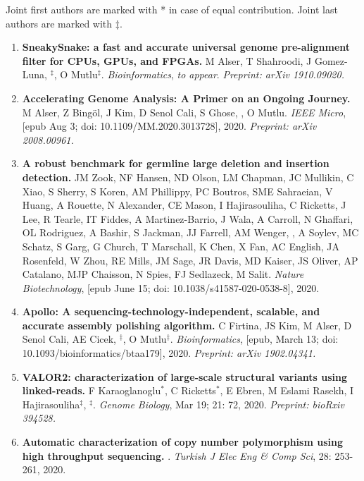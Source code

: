                                        \small{
                                         Joint first authors are marked with * in case of equal contribution. Joint last authors are marked with $\ddag$.
                                       }
\begin{enumerate}
    
\item
{\bf SneakySnake: a fast and accurate universal genome pre-alignment filter for CPUs, GPUs, and FPGAs.} M Alser, T Shahroodi, J Gomez-Luna, \calkan{}$^\ddag$, O Mutlu$^\ddag$. {\it Bioinformatics}, \textit{to appear}. \textit {Preprint: arXiv 1910.09020.}


 \item
 {\bf Accelerating Genome Analysis: A Primer on an Ongoing Journey.} M Alser, Z Bingöl, J Kim, D Senol Cali, S Ghose, \calkan{}, O Mutlu. {\it IEEE Micro}, [epub Aug 3; doi:   10.1109/MM.2020.3013728], 2020. \textit{Preprint: arXiv 2008.00961.}

 \item
 {\bf A robust benchmark for germline large deletion and insertion detection.}
 JM Zook, NF Hansen, ND Olson, LM Chapman, JC Mullikin, C Xiao, S Sherry, S Koren, AM Phillippy, PC Boutros, SME Sahraeian, V Huang, A Rouette, N Alexander, CE Mason, I Hajirasouliha, C Ricketts, J Lee, R Tearle, IT Fiddes, A Martinez-Barrio, J Wala, A Carroll, N Ghaffari, OL Rodriguez, A Bashir, S Jackman, JJ Farrell, AM Wenger, \calkan{}, A Soylev, MC Schatz, S Garg, G Church, T Marschall, K Chen, X Fan, AC English, JA Rosenfeld, W Zhou, RE Mills, JM Sage, JR Davis, MD Kaiser, JS Oliver, AP Catalano, MJP Chaisson, N Spies, FJ Sedlazeck, M Salit. 
 {\it Nature Biotechnology},  [epub June 15; doi: 10.1038/s41587-020-0538-8], 2020.


\item
{\bf Apollo: A sequencing-technology-independent, scalable, and accurate assembly polishing algorithm.} C Firtina, JS Kim, M Alser, D Senol Cali, AE Cicek, \calkan{}$^\ddag$, O Mutlu$^\ddag$. {\it Bioinformatics}, [epub, March 13; doi: 10.1093/bioinformatics/btaa179], 2020.
\textit{Preprint: arXiv 1902.04341.}

\item
 {\bf VALOR2: characterization of large-scale structural variants using linked-reads.}
 F Karaoglanoglu$^*$, C Ricketts$^*$, E Ebren, M Eslami Rasekh,  I Hajirasouliha$^\ddag$, \calkan{}$^\ddag$.
{\it Genome Biology}, Mar 19; 21: 72, 2020.  \textit{Preprint: bioRxiv 394528.}

   \item
         {\bf Automatic characterization of copy number polymorphism using high throughput sequencing.}  \calkan{}. {\em Turkish J Elec Eng \& Comp Sci}, 28: 253-261, 2020.
         

\end{enumerate}
